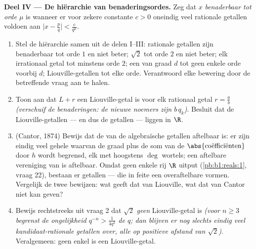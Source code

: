 \begin{problem}
\medskip
\noindent\textbf{Deel IV --- De hiërarchie van
benaderingsordes.} Zeg dat $x$ \emph{benaderbaar tot orde $\mu$}
is wanneer er voor zekere constante $c > 0$ oneindig veel
rationale getallen voldoen aan $\bigl|x - \frac pq\bigr| <
\frac{c}{q^{\mu}}$.
\begin{enumerate}[resume]
  \item Stel de hiërarchie samen uit de delen I--III: rationale
        getallen zijn benaderbaar tot orde $1$ en niet beter;
        $\sqrt 2$ tot orde $2$ en niet beter; elk irrationaal
        getal tot minstens orde $2$; een  van
        graad $d$ tot geen enkele orde voorbij $d$;
        Liouville-getallen tot elke orde. Verantwoord elke
        bewering door de betreffende vraag aan te halen.
  \item Toon aan dat $L + r$ een Liouville-getal is voor elk
        rationaal getal $r = \frac ab$ \emph{(verschuif de
        benaderingen: de nieuwe noemers zijn $b\,q_k$)}. Besluit
        dat de Liouville-getallen --- en dus de 
        getallen ---  liggen in $\R$.
  \item (Cantor, 1874) Bewijs dat de  van de
        algebraïsche getallen aftelbaar is: er zijn eindig veel
        gehele  waarvan de graad plus de som van de
        $\abs{\text{coëfficiënten}}$ door $h$ wordt begrensd, elk
        met hoogstens $\deg$ wortels; een aftelbare vereniging van
         is aftelbaar. Omdat geen enkele rij
        $\R$ uitput (\cref{pb:b1:reals:1}, vraag 22), bestaan er
         getallen --- die in feite een overaftelbare
         vormen. Vergelijk de twee bewijzen: wat geeft
        dat van Liouville, wat dat van Cantor niet kan geven?
  \item Bewijs rechtstreeks uit vraag 2 dat $\sqrt 2$ \emph{geen}
        Liouville-getal is \emph{(voor $n \geq 3$ begrenst de
        ongelijkheid $q^{-n} > \frac{1}{4q^2}$ de $q$; dan blijven
        er nog slechts eindig veel kandidaat-rationale getallen
        over, alle op positieve afstand van $\sqrt2$)}.
        Veralgemeen: geen enkel  is een
        Liouville-getal.
\end{enumerate}


\end{problem}
